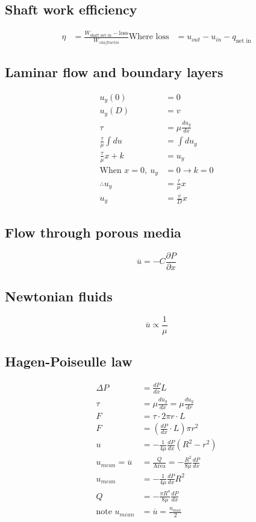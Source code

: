 \documentclass[class=report, crop=false, 12pt,a4paper]{standalone}
\begin{document}
\subsection{Shaft work efficiency}
\begin{align*}
  \eta &= \frac{W_{\textrm{shaft net in}} - \textrm{loss}}{W_{shaft net in}} 
  \textrm{Where loss} &= u_{out} - u_{in} - q_{\textrm{net in}}
\end{align*}
\subsection{Laminar flow and boundary layers}
\begin{align*}
  u_y(0) &= 0\\
  u_y(D) &= v\\
  \tau &= \mu \frac{du_y}{dx} \\ 
  \frac{\tau}{\mu}\int du &= \int du_y\\
  \frac{\tau}{\mu}x + k &= u_y\\
  \textrm{When } x=0, \ u_y &= 0 \rightarrow k = 0\\
  \therefore u_y &= \frac{\tau}{\mu} x\\
  u_y &= \frac{v}{D} x
\end{align*}
\subsection{Flow through porous media}
\[ \overline{u} = -C \frac{\partial P}{\partial x} \]
\subsection{Newtonian fluids}
\[ \overline{u} \propto \frac{1}{\mu} \] 
\subsection{Hagen-Poiseulle law}
\begin{align*}
  \Delta P &= \frac{dP}{dx} L\\
  \tau &= \mu \frac{du_y}{dx} = \mu \frac{du_y}{dr}\\
  F &= \tau \cdot 2\pi r \cdot L\\
  F &= \left( \frac{dP}{dx} \cdot L \right) \pi r^2\\
  u &= - \frac{1}{4\mu} \frac{dP}{dx}(R^2 - r^2)\\
  u_{mean} = \overline{u} &= \frac{Q}{\textrm{Area}} = -\frac{R^2}{8\mu}\frac{dP}{dx}\\
  u_{mean} &= -\frac{1}{4\mu} \frac{dP}{dx} R^2\\
  Q &= -\frac{\pi R^4}{8\mu}\frac{dP}{dx}\\
  \textrm{note } u_{mean} &= \overline{u} = \frac{u_{max}}{2}
\end{align*}
\end{document}
